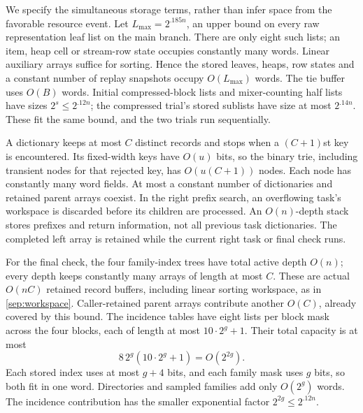 We specify the simultaneous storage terms, rather than infer space
from the favorable resource event. Let \(L_{\max}=2^{.185n}\), an
upper bound on every raw representation leaf list on the main branch.
There are only eight such lists; an item, heap cell or stream-row
state occupies constantly many words. Linear auxiliary arrays suffice
for sorting. Hence the stored leaves, heaps, row states and a constant
number of replay snapshots occupy \(O(L_{\max})\) words. The tie
buffer uses \(O(B)\) words. Initial compressed-block lists and
mixer-counting half lists have sizes \(2^s\le2^{.12n}\); the
compressed trial's stored sublists have size at most \(2^{.14n}\).
These fit the same bound, and the two trials run sequentially.

A dictionary keeps at most \(C\) distinct records and stops when a
\((C+1)\)st key is encountered. Its fixed-width keys have \(O(u)\)
bits, so the binary trie, including transient nodes for that rejected
key, has \(O(u(C+1))\) nodes. Each node has constantly many word
fields. At most a constant number of dictionaries and retained parent
arrays coexist. In the right prefix search, an overflowing task's
workspace is discarded before its children are processed. An
\(O(n)\)-depth stack stores prefixes and return information, not all
previous task dictionaries. The completed left array is retained
while the current right task or final check runs.

For the final check, the four family-index trees have total active
depth \(O(n)\); every depth keeps constantly many arrays of length at
most \(C\). These are actual \(O(nC)\) retained record buffers,
including linear sorting workspace, as in \eqref{sep:workspace}.
Caller-retained parent arrays contribute another \(O(C)\), already
covered by this bound. The incidence tables have eight lists per
block mask across the four blocks, each of length at most
\(10\cdot2^g+1\). Their total capacity is at most
\[
 8\,2^g(10\cdot2^g+1)=O(2^{2g}).
\]
Each stored index uses at most \(g+4\) bits, and each family mask uses
\(g\) bits, so both fit in one word. Directories and sampled families
add only \(O(2^g)\) words. The incidence contribution has the smaller
exponential factor
\(2^{2g}\le2^{.12n}\).

